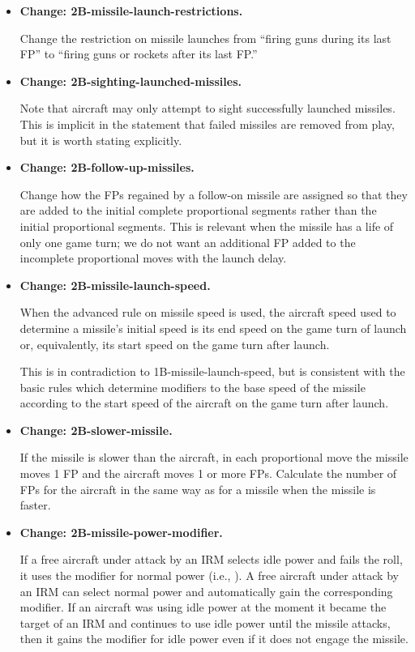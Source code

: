\documentclass{report}
\newcommand{\changetag}[1]{\textbf{Change: #1.}\par}
\begin{document}
\begin{itemize}
    \item\changetag{2B-missile-launch-restrictions}

        Change the restriction on missile launches from “firing guns during its last FP” to “firing guns or rockets after its last FP.”

    \item\changetag{2B-sighting-launched-missiles}

        Note that aircraft may only attempt to sight successfully launched missiles. This is implicit in the statement that failed missiles are removed from play, but it is worth stating explicitly.

    \item\changetag{2B-follow-up-missiles}

        Change how the FPs regained by a follow-on missile are assigned so that they are added to the initial complete proportional segments rather than the initial proportional segments. This is relevant when the missile has a life of only one game turn; we do not want an additional FP added to the incomplete proportional moves with the launch delay.

    \item\changetag{2B-missile-launch-speed}

        When the advanced rule on missile speed is used, the aircraft speed used to determine a missile's initial speed is its end speed on the game turn of launch or, equivalently, its start speed on the game turn after launch.

        This is in contradiction to 1B-missile-launch-speed, but is consistent with the basic rules which determine modifiers to the base speed of the missile according to the start speed of the aircraft on the game turn after launch.

    \item\changetag{2B-slower-missile}

        If the missile is slower than the aircraft, in each proportional move the missile moves 1 FP and the aircraft moves 1 or more FPs. Calculate the number of FPs for the aircraft in the same way as for a missile when the missile is faster.

    \item\changetag{2B-missile-power-modifier}

        If a free aircraft under attack by an IRM selects idle power and fails the roll, it uses the modifier for normal power (i.e., ). A free aircraft under attack by an IRM can select normal power and automatically gain the corresponding modifier. If an aircraft was using idle power at the moment it became the target of an IRM and continues to use idle power until the missile attacks, then it gains the  modifier for idle power even if it does not engage the missile.


\end{itemize}
\end{document}
